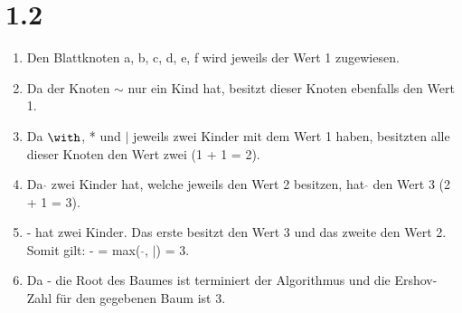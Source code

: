 \documentclass{article}
\begin{document}
\section{1.2}
\begin{enumerate}
    \item Den Blattknoten a, b, c, d, e, f wird jeweils der Wert 1 zugewiesen.
    \item Da der Knoten $\sim$ nur ein Kind hat, besitzt dieser 
        Knoten ebenfalls den Wert 1.
    \item Da $\with$, * und $|$ jeweils zwei Kinder mit dem Wert 1 haben,
        besitzten alle dieser Knoten den Wert zwei (1 + 1 = 2).
    \item Da $\hat{}$ zwei Kinder hat, welche jeweils den Wert 2 
        besitzen, hat $\hat{}$ den Wert 3 (2 + 1 = 3).
    \item - hat zwei Kinder. Das erste besitzt den Wert 3 und das 
        zweite den Wert 2. Somit gilt: - = max( $\hat{}$, $|$) = 3.
    \item Da - die Root des Baumes ist terminiert der Algorithmus und die 
        Ershov-Zahl für den gegebenen Baum ist 3.
\end{enumerate}
\end{document}
